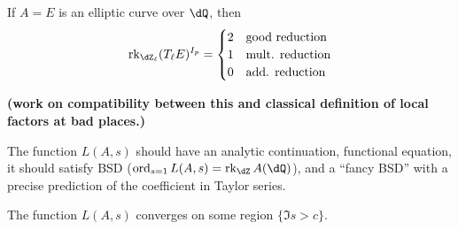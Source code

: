 If $A=E$ is an elliptic curve over $\dQ$, then 
\[
  \rank_{\dZ_\ell} (T_\ell E)^{I_p}
  =
  \begin{cases}
    2 & \text{good reduction} \\
    1 & \text{mult. reduction} \\
    0 & \text{add. reduction}
  \end{cases}
\]

\textbf{(work on compatibility between this and classical definition of 
local factors at bad places.)}

The function $L(A,s)$ should have an analytic continuation, functional equation, 
it should satisfy BSD ($\ord_{s=1} L(A,s) = \rank_\dZ A(\dQ)$), and a ``fancy BSD'' 
with a precise prediction of the coefficient in Taylor series. 

The function $L(A,s)$ converges on some region $\{\Im s>c\}$. 









